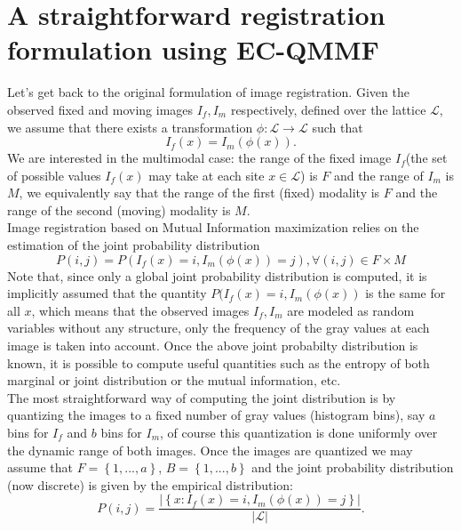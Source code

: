 \documentclass[11pt]{article}
\begin{document}
\section{A straightforward registration formulation using EC-QMMF}
Let's get back to the original formulation of image registration. Given the observed fixed and moving images $I_{f}, I_{m}$ respectively, defined over the lattice $\mathcal{L}$, we assume that there exists a transformation $\phi:\mathcal{L} \rightarrow \mathcal{L}$ such that
\begin{equation}
	I_{f}(x) = I_{m}(\phi(x)).
\end{equation}
We are interested in the multimodal case: the range of the fixed image $I_f$(the set of possible values $I_{f}(x)$ may take at each site $x\in \mathcal{L}$) is $F$ and the range of $I_{m}$ is $M$, we equivalently say that the range of the first (fixed) modality is $F$ and the range of the second (moving) modality is $M$.\\

Image registration based on Mutual Information maximization relies on the estimation of the joint probability distribution
\begin{equation}
	P(i, j)=P(I_{f}(x)=i,I_{m}(\phi(x))=j), \forall (i,j)\in F\times M
\end{equation}
Note that, since only a global joint probability distribution is computed, it is implicitly assumed that the quantity $P(I_{f}(x)=i,I_{m}(\phi(x))$ is the same for all $x$, which means that the observed images $I_{f}, I_{m}$ are modeled as random variables without any structure, only the frequency of the gray values at each image is taken into account. Once the above joint probabilty distribution is known, it is possible to compute useful quantities such as the entropy of both marginal or joint distribution or the mutual information, etc.\\

The most straightforward way of computing the joint distribution is by quantizing the images to a fixed number of gray values (histogram bins), say $a$ bins for $I_f$ and $b$ bins for $I_m$, of course this quantization is done uniformly over the dynamic range of both images. Once the images are quantized we may assume that $F = \left\lbrace 1, ...,a\right\rbrace$, $B = \left\lbrace 1, ...,b\right\rbrace$ and the joint probability distribution (now discrete) is given by the empirical distribution:
\begin{equation}
	P(i,j) = \frac{|\left\lbrace x : I_{f}(x)=i, I_{m}(\phi(x))=j\right\rbrace|}{|\mathcal{L}|}.
\end{equation}
\end{document}
